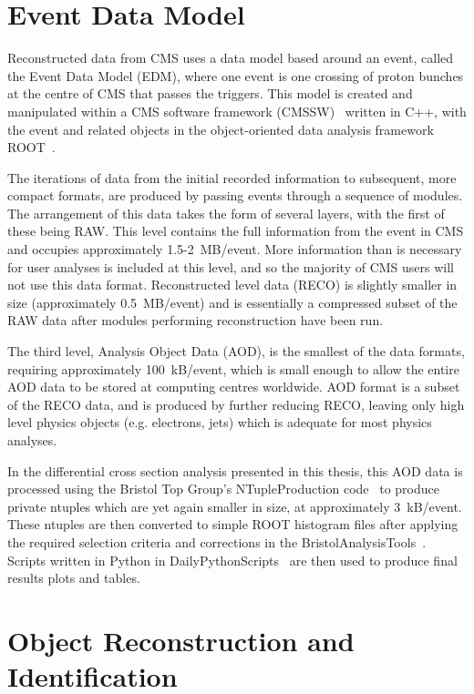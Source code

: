 \section{Event Data Model}
\label{s:Event_Data_Model}
Reconstructed data from CMS uses a data model based around an event, called the Event Data Model (EDM), where
one event is one crossing of proton bunches at the centre of CMS that passes the triggers. This model
is created and manipulated within a CMS software framework (CMSSW)~\cite{cmssw} written in C++, with the event
and related objects in the object-oriented data analysis framework ROOT~\cite{ROOT}.

The iterations of data from the initial recorded information to subsequent, more compact formats, are produced
by passing events through a sequence of modules. The arrangement of this data takes the form of several
layers, with the first of these being RAW. This level contains the full information from the event in CMS and
occupies approximately 1.5-2~MB/event. More information than is necessary for user analyses is included at
this level, and so the majority of CMS users will not use this data format. Reconstructed level data (RECO) is
slightly smaller in size (approximately 0.5~MB/event) and is essentially a compressed subset of the RAW data
after modules performing reconstruction have been run.

The third level, Analysis Object Data (AOD), is the smallest of the data formats, requiring approximately
100~kB/event, which is small enough to allow the entire AOD data to be stored at computing centres worldwide.
AOD format is a subset of the RECO data, and is produced by further reducing RECO, leaving only high level
physics objects (e.g. electrons, jets) which is adequate for most physics analyses. 

In the differential cross section analysis presented in this thesis, this AOD data is processed using the
Bristol Top Group's NTupleProduction code~\cite{NTT_LukeKreczko_SergeySenkin_JesonJacob_EmyrClement_2015} to
produce private ntuples which are yet again smaller in size, at approximately 3~kB/event. These ntuples are
then converted to simple ROOT histogram files after applying the required selection criteria and corrections
in the BristolAnalysisTools~\cite{BAT_LukeKreczko_JesonJacob_SergeySenkin_EmyrClement_2015}. Scripts written
in Python in DailyPythonScripts~\cite{DPS_LukeKreczko_SergeySenkin_JesonJacob_EmyrClement_2015} are then used
to produce final results plots and tables.

\section{Object Reconstruction and Identification}
\label{s:object_reconstruction_and_identification}

